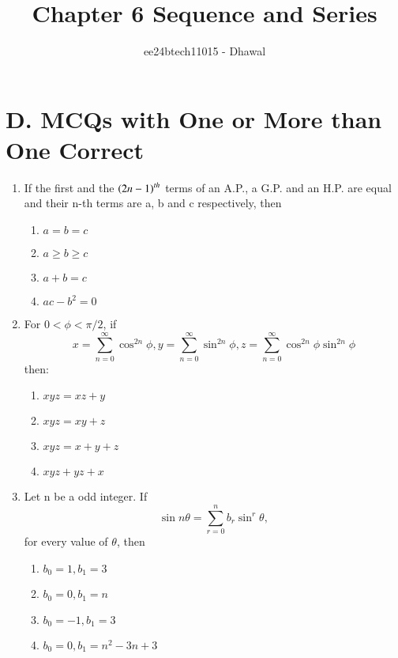 \documentclass[journal,12pt,twocolumn]{IEEEtran}
\theoremstyle{remark}
\begin{document}

\vspace{3cm}

\title{Chapter 6 Sequence and Series}
\author{ee24btech11015 - Dhawal}
\maketitle
\newpage
\bigskip

\renewcommand{\thefigure}{\theenumi}
\renewcommand{\thetable}{\theenumi}

\section*{D. MCQs with One or More than One Correct}
\begin{enumerate}
	\item If the first and the $\left(2n-1\right)^{th} $ terms of an A.P., a G.P. and an H.P. are equal and their n-th terms are a, b and c respectively, then 
\hfill{}
\begin{multicols}{2}
\begin{enumerate}
\item $a=b=c$
\item $a \geq b \geq c$
\item $a+b=c$
\item $ac-b^2=0$
\end{enumerate}
\end{multicols}

\item For $0 < \phi < \pi /2$, if 
\begin{equation*}
x=\sum_{n=0}^{\infty} \cos^{2n} \phi ,
y=\sum_{n=0}^{\infty} \sin^{2n} \phi ,
z=\sum_{n=0}^{\infty} \cos^{2n} \phi \sin^{2n} \phi
\end{equation*}
then: \hfill{}
\begin{multicols}{2}
\begin{enumerate}
\item $xyz=xz+y$
\item $xyz=xy+z$
\item $xyz=x+y+z$
\item $xyz+yz+x$
\end{enumerate}
\end{multicols}

\item Let n be a odd integer. If 
\begin{equation*}
\sin n\theta= \sum_{r=0}^{n} b_r \sin^{r} \theta, 
\end{equation*}
for every value of $\theta$, then
\hfill{}
\begin{enumerate}
\item $b_0=1, b_1=3$
\item $b_0=0, b_1=n$
\item $b_0=-1, b_1=3$
\item $b_0=0, b_1=n^2-3n+3$
\end{enumerate}


\end{enumerate}
\end{document}
